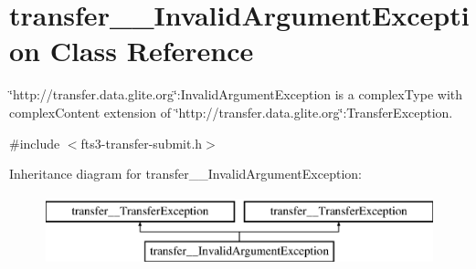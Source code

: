 \section{transfer\_\-\_\-InvalidArgumentException Class Reference}
\label{classtransfer____InvalidArgumentException}


\char`\"{}http://transfer.data.glite.org\char`\"{}:InvalidArgumentException is a complexType with complexContent extension of \char`\"{}http://transfer.data.glite.org\char`\"{}:TransferException.  




{\ttfamily \#include $<$fts3-\/transfer-\/submit.h$>$}

Inheritance diagram for transfer\_\-\_\-InvalidArgumentException:\begin{figure}[H]
\begin{center}
\leavevmode
\includegraphics[height=2.000000cm]{classtransfer____InvalidArgumentException}
\end{center}
\end{figure}
